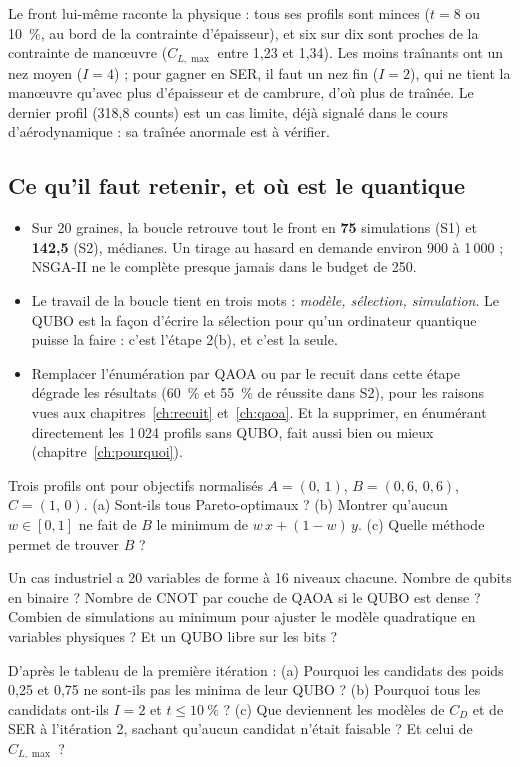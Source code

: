 Le front lui-même raconte la physique : tous ses profils sont minces ($t=8$ ou 10~\%, au bord de la contrainte d'épaisseur), et six sur dix sont proches de la contrainte de manœuvre ($C_{L,\max}$ entre 1,23 et 1,34). Les moins traînants ont un nez moyen ($I=4$) ; pour gagner en SER, il faut un nez fin ($I=2$), qui ne tient la manœuvre qu'avec plus d'épaisseur et de cambrure, d'où plus de traînée. Le dernier profil (318,8 counts) est un cas limite, déjà signalé dans le cours d'aérodynamique : sa traînée anormale est à vérifier.

\subsection{Ce qu'il faut retenir, et où est le quantique}
\begin{itemize}
\item Sur 20 graines, la boucle retrouve tout le front en \textbf{75} simulations (S1) et \textbf{142,5} (S2), médianes. Un tirage au hasard en demande environ 900 à 1\,000 ; NSGA-II ne le complète presque jamais dans le budget de 250.
\item Le travail de la boucle tient en trois mots : \emph{modèle, sélection, simulation}. Le QUBO est la façon d'écrire la sélection pour qu'un ordinateur quantique puisse la faire : c'est l'étape 2(b), et c'est la seule.
\item Remplacer l'énumération par QAOA ou par le recuit dans cette étape dégrade les résultats (60~\% et 55~\% de réussite dans S2), pour les raisons vues aux chapitres~\ref{ch:recuit} et~\ref{ch:qaoa}. Et la supprimer, en énumérant directement les 1\,024 profils sans QUBO, fait aussi bien ou mieux (chapitre~\ref{ch:pourquoi}).
\end{itemize}

\exercices
\begin{exercice}
Trois profils ont pour objectifs normalisés $A=(0,\,1)$, $B=(0{,}6,\,0{,}6)$, $C=(1,\,0)$. (a) Sont-ils tous Pareto-optimaux ? (b) Montrer qu'aucun $w\in[0,1]$ ne fait de $B$ le minimum de $w\,x+(1-w)\,y$. (c) Quelle méthode permet de trouver $B$ ?
\end{exercice}
\begin{exercice}
Un cas industriel a 20 variables de forme à 16 niveaux chacune. Nombre de qubits en binaire ? Nombre de CNOT par couche de QAOA si le QUBO est dense ? Combien de simulations au minimum pour ajuster le modèle quadratique en variables physiques ? Et un QUBO libre sur les bits ?
\end{exercice}
\begin{exercice}\label{ex:trace}
D'après le tableau de la première itération : (a) Pourquoi les candidats des poids 0,25 et 0,75 ne sont-ils pas les minima de leur QUBO ? (b) Pourquoi tous les candidats ont-ils $I=2$ et $t\le10~\%$ ? (c) Que deviennent les modèles de $C_D$ et de SER à l'itération 2, sachant qu'aucun candidat n'était faisable ? Et celui de $C_{L,\max}$ ?
\end{exercice}

